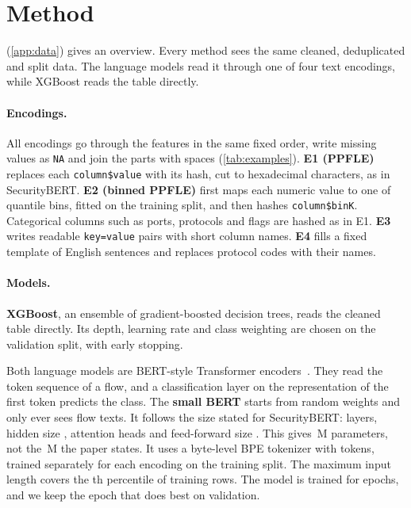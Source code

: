 \section{Method}\label{sec:method}
 (\cref{app:data}) gives an overview. Every method sees the same cleaned, deduplicated and split data. The language
models read it through one of four text encodings, while XGBoost reads the table directly.


\paragraph{Encodings.} All encodings go through the features in the same fixed order, write missing values as
\texttt{NA} and join the parts with spaces (\cref{tab:examples}).
\textbf{E1 (PPFLE)} replaces each \texttt{column\$value} with its  hash, cut to
 hexadecimal characters, as in SecurityBERT.
\textbf{E2 (binned PPFLE)} first maps each numeric value to one of  quantile bins,
fitted on the training split, and then hashes \texttt{column\$binK}. Categorical columns such as ports, protocols and
flags are hashed as in E1. \textbf{E3} writes readable \texttt{key=value} pairs with short column names. \textbf{E4}
fills a fixed template of English sentences and replaces protocol codes with their names.

\begin{table}[!tbp]
  \centering
  \caption{The same NetFlow flow in the four encodings (beginning of each text only).}
  \label{tab:examples}
  
\end{table}

\paragraph{Models.} \textbf{XGBoost}, an ensemble of gradient-boosted decision trees, reads the cleaned table
directly. Its depth, learning rate and class weighting are chosen on the validation split, with early stopping.

Both language models are BERT-style Transformer encoders~\cite{devlin2019bert}. They read the token sequence of a
flow, and a classification layer on the representation of the first token predicts the class. The \textbf{small
BERT} starts from random weights and only ever sees flow texts. It follows the size stated for SecurityBERT: 
layers, hidden size ,  attention
heads and feed-forward size . This gives \,M
parameters, not the \,M the paper states. It uses a byte-level BPE tokenizer with
 tokens, trained separately for each encoding on the training split. The
maximum input length covers the th percentile of training rows. The
model is trained for  epochs, and we keep the epoch that does best on validation.

